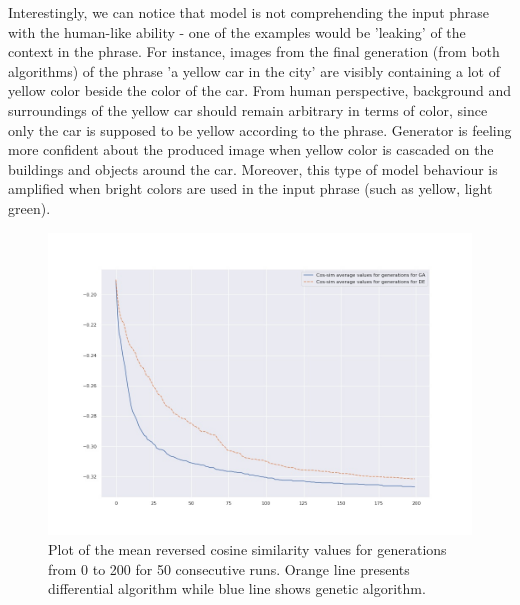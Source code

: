 \documentclass[11pt,a4paper,openany]{book}
\begin{document}
\noindent Interestingly, we can notice that model is not comprehending the input phrase with the human-like ability - one of the examples would be 'leaking' of the context in the phrase. For instance, images from the final generation (from both algorithms) of the phrase 'a yellow car in the city' are visibly containing a lot of yellow color beside the color of the car. From human perspective, background and surroundings of the yellow car should remain arbitrary in terms of color, since only the car is supposed to be yellow according to the phrase. Generator is feeling more confident about the produced image when yellow color is cascaded on the buildings and objects around the car. Moreover, this type of model behaviour is amplified when bright colors are used in the input phrase (such as yellow, light green).
\begin{figure}[h]
    \includegraphics[scale=0.45]{figs/avg_mean.jpg}
    \caption{Plot of the mean reversed cosine similarity values for generations from 0 to 200 for 50 consecutive runs. Orange line presents differential algorithm while blue line shows genetic algorithm.}\label{Fig:STYLEGAN}
\end{figure}
\end{document}
